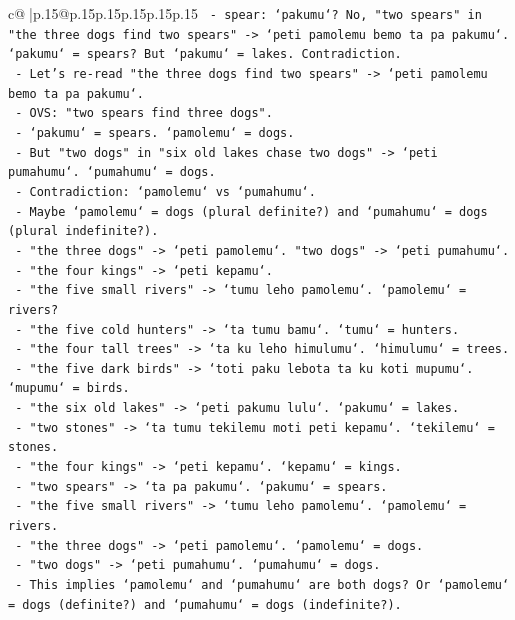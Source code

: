 \documentclass{article}
\begin{document}
{\begin{supertabular}{c@{$\;$}|p{.15\linewidth}@{}p{.15\linewidth}p{.15\linewidth}p{.15\linewidth}p{.15\linewidth}p{.15\linewidth}}
{{{\texttt{  {-} spear: `pakumu`? No, "two spears" in "the three dogs find two spears" {-}> `peti pamolemu bemo ta pa pakumu`. `pakumu` = spears? But `pakumu` = lakes. Contradiction.} \\
\texttt{    {-} Let's re{-}read "the three dogs find two spears" {-}> `peti pamolemu bemo ta pa pakumu`.} \\
\texttt{    {-} OVS: "two spears find three dogs".} \\
\texttt{    {-} `pakumu` = spears. `pamolemu` = dogs.} \\
\texttt{    {-} But "two dogs" in "six old lakes chase two dogs" {-}> `peti pumahumu`. `pumahumu` = dogs.} \\
\texttt{    {-} Contradiction: `pamolemu` vs `pumahumu`.} \\
\texttt{    {-} Maybe `pamolemu` = dogs (plural definite?) and `pumahumu` = dogs (plural indefinite?).} \\
\texttt{    {-} "the three dogs" {-}> `peti pamolemu`. "two dogs" {-}> `peti pumahumu`.} \\
\texttt{    {-} "the four kings" {-}> `peti kepamu`.} \\
\texttt{    {-} "the five small rivers" {-}> `tumu leho pamolemu`. `pamolemu` = rivers?} \\
\texttt{    {-} "the five cold hunters" {-}> `ta tumu bamu`. `tumu` = hunters.} \\
\texttt{    {-} "the four tall trees" {-}> `ta ku leho himulumu`. `himulumu` = trees.} \\
\texttt{    {-} "the five dark birds" {-}> `toti paku lebota ta ku koti mupumu`. `mupumu` = birds.} \\
\texttt{    {-} "the six old lakes" {-}> `peti pakumu lulu`. `pakumu` = lakes.} \\
\texttt{    {-} "two stones" {-}> `ta tumu tekilemu moti peti kepamu`. `tekilemu` = stones.} \\
\texttt{    {-} "the four kings" {-}> `peti kepamu`. `kepamu` = kings.} \\
\texttt{    {-} "two spears" {-}> `ta pa pakumu`. `pakumu` = spears.} \\
\texttt{    {-} "the five small rivers" {-}> `tumu leho pamolemu`. `pamolemu` = rivers.} \\
\texttt{    {-} "the three dogs" {-}> `peti pamolemu`. `pamolemu` = dogs.} \\
\texttt{    {-} "two dogs" {-}> `peti pumahumu`. `pumahumu` = dogs.} \\
\texttt{    {-} This implies `pamolemu` and `pumahumu` are both dogs? Or `pamolemu` = dogs (definite?) and `pumahumu` = dogs (indefinite?).} \\
}}}
\end{supertabular}}
\end{document}
